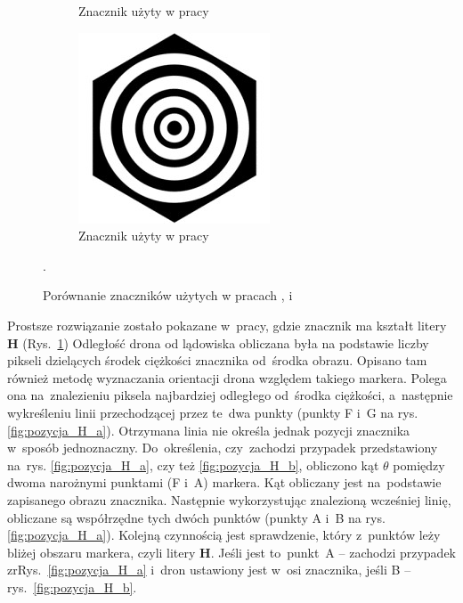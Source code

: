 \begin{figure}
\begin{subfigure}{0.3\textwidth}
		\caption{Znacznik użyty w pracy \cite{H}}
		\label{fig:znacznik_H}
		\end{subfigure}
		\begin{subfigure}{0.3\textwidth}
		\centering
		\includegraphics[width=\textwidth]{znacznik_rings.jpg}
		\caption{Znacznik użyty w pracy \cite{Rings}}
		\label{fig:znacznik_rings}
		\end{subfigure}
	\caption{Porównanie znaczników użytych w pracach \cite{Rings},\cite{Falanga} i \cite{H}}.
	\label{fig:Znaczniki}
\end{figure}


Prostsze rozwiązanie zostało pokazane w~pracy\cite{H}, gdzie znacznik ma kształt litery \textbf{H} (Rys.~\ref{fig:znacznik_H}) 
Odległość drona od lądowiska obliczana była na podstawie liczby pikseli dzielących środek ciężkości znacznika od~środka obrazu. 
Opisano tam również metodę wyznaczania orientacji drona względem takiego markera. 
Polega ona na~znalezieniu piksela najbardziej odległego od~środka ciężkości, a~następnie wykreśleniu linii przechodzącej przez te~dwa punkty (punkty F i~G na rys. \ref{fig:pozycja_H_a}). 
Otrzymana linia nie określa jednak pozycji znacznika w~sposób jednoznaczny.
Do~określenia, czy~zachodzi przypadek przedstawiony na~rys. \ref{fig:pozycja_H_a}, czy też \ref{fig:pozycja_H_b}, obliczono kąt $\theta$ pomiędzy dwoma narożnymi punktami (F i~A) markera.
Kąt obliczany jest na~podstawie zapisanego obrazu znacznika. 
Następnie wykorzystując znalezioną wcześniej linię, obliczane są współrzędne tych dwóch punktów (punkty A i~B na rys. \ref{fig:pozycja_H_a}). 
Kolejną czynnością jest sprawdzenie, który z~punktów leży bliżej obszaru markera, czyli litery \textbf{H}. 
Jeśli jest to~punkt~A -- zachodzi przypadek zrRys.~\ref{fig:pozycja_H_a} i~dron ustawiony jest w~osi znacznika, jeśli B --rys.~\ref{fig:pozycja_H_b}.

